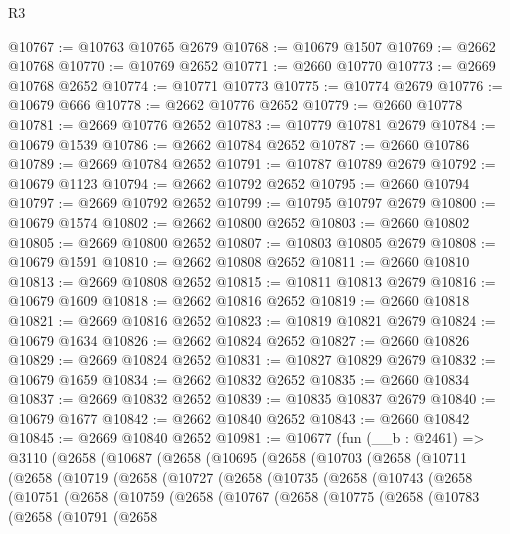 \begin{lexlean}{R3}
\begin{coremodule}
@10767 := @10763 @10765 @2679
@10768 := @10679 @1507
@10769 := @2662 @10768
@10770 := @10769 @2652
@10771 := @2660 @10770
@10773 := @2669 @10768 @2652
@10774 := @10771 @10773
@10775 := @10774 @2679
@10776 := @10679 @666
@10778 := @2662 @10776 @2652
@10779 := @2660 @10778
@10781 := @2669 @10776 @2652
@10783 := @10779 @10781 @2679
@10784 := @10679 @1539
@10786 := @2662 @10784 @2652
@10787 := @2660 @10786
@10789 := @2669 @10784 @2652
@10791 := @10787 @10789 @2679
@10792 := @10679 @1123
@10794 := @2662 @10792 @2652
@10795 := @2660 @10794
@10797 := @2669 @10792 @2652
@10799 := @10795 @10797 @2679
@10800 := @10679 @1574
@10802 := @2662 @10800 @2652
@10803 := @2660 @10802
@10805 := @2669 @10800 @2652
@10807 := @10803 @10805 @2679
@10808 := @10679 @1591
@10810 := @2662 @10808 @2652
@10811 := @2660 @10810
@10813 := @2669 @10808 @2652
@10815 := @10811 @10813 @2679
@10816 := @10679 @1609
@10818 := @2662 @10816 @2652
@10819 := @2660 @10818
@10821 := @2669 @10816 @2652
@10823 := @10819 @10821 @2679
@10824 := @10679 @1634
@10826 := @2662 @10824 @2652
@10827 := @2660 @10826
@10829 := @2669 @10824 @2652
@10831 := @10827 @10829 @2679
@10832 := @10679 @1659
@10834 := @2662 @10832 @2652
@10835 := @2660 @10834
@10837 := @2669 @10832 @2652
@10839 := @10835 @10837 @2679
@10840 := @10679 @1677
@10842 := @2662 @10840 @2652
@10843 := @2660 @10842
@10845 := @2669 @10840 @2652
@10981 := @10677
    (fun (__b : @2461) =>
    @3110
      (@2658
        (@10687
          (@2658
            (@10695
              (@2658
                (@10703
                  (@2658
                    (@10711
                      (@2658
                        (@10719
                          (@2658
                            (@10727
                              (@2658
                                (@10735
                                  (@2658
                                    (@10743
                                      (@2658
                                        (@10751
                                          (@2658
                                            (@10759
                                              (@2658
                                                (@10767
                                                  (@2658
                                                    (@10775
                                                      (@2658
                                                        (@10783
                                                          (@2658
                                                            (@10791
                                                              (@2658

\end{coremodule}
\end{lexlean}
